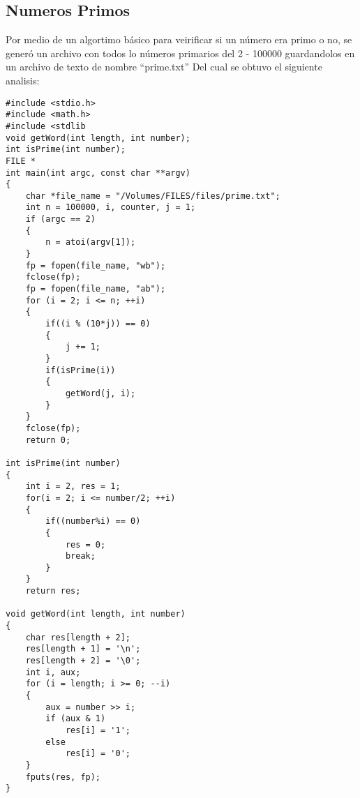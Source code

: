 \documentclass[a4paper]{article}
\begin{document}
            \subsection{Numeros Primos}
            Por medio de un algortimo básico para veirificar si un número era primo o no, se generó un archivo con todos lo números primarios del 2 - 100000 guardandolos en un archivo de texto de nombre ``prime.txt''
            Del cual se obtuvo el siguiente analisis:

            \begin{lstlisting}
#include <stdio.h>
#include <math.h>
#include <stdlib
void getWord(int length, int number);
int isPrime(int number);
FILE *
int main(int argc, const char **argv)
{
    char *file_name = "/Volumes/FILES/files/prime.txt";
    int n = 100000, i, counter, j = 1;
    if (argc == 2)
    {
        n = atoi(argv[1]);
    }
    fp = fopen(file_name, "wb");
    fclose(fp);
    fp = fopen(file_name, "ab");
    for (i = 2; i <= n; ++i)
    {
        if((i % (10*j)) == 0)
        {
            j += 1;
        }
        if(isPrime(i))
        {
            getWord(j, i);
        }
    }
    fclose(fp);
    return 0;

int isPrime(int number)
{
    int i = 2, res = 1;
    for(i = 2; i <= number/2; ++i)
    {
        if((number%i) == 0)
        {
            res = 0;
            break;
        }
    }
    return res;

void getWord(int length, int number)
{
    char res[length + 2];
    res[length + 1] = '\n';
    res[length + 2] = '\0';
    int i, aux;
    for (i = length; i >= 0; --i)
    {
        aux = number >> i;
        if (aux & 1)
            res[i] = '1';
        else
            res[i] = '0';
    }
    fputs(res, fp);
}
            \end{lstlisting}
            
            
\end{document}
